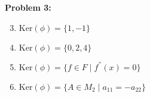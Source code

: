 \documentclass[12pt, letterpaper]{article}
\newenvironment{problem}
    [1]
    {\noindent \textbf{Problem #1:}}
    {\vspace{3mm}}
\begin{document}
\begin{problem}{3}
    \begin{enumerate}
        \setcounter{enumi}{2}

        \item $\text{Ker}(\phi) = \{1, -1\}$

        \item $\text{Ker}(\phi) = \{0, 2, 4\}$

        \setcounter{enumi}{8}

        \item $\text{Ker}(\phi) = \{f \in F \;|\; f^{''}(x) = 0 \}$
        
        \setcounter{enumi}{12}

        \item $\text{Ker}(\phi) = \{A \in M_2 \;|\; a_{11} = -a_{22}\}$
    \end{enumerate}
\end{problem}
\end{document}

